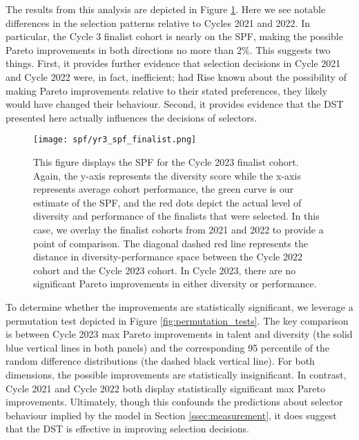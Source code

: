 
The results from this analysis are depicted in Figure \ref{fig:spf_2023}. Here we see notable differences in the selection patterns relative to Cycles 2021 and 2022. In particular, the Cycle 3 finalist cohort is nearly on the SPF, making the possible Pareto improvements in both directions no more than $2\%$. This suggests two things. First, it provides further evidence that selection decisions in Cycle 2021 and Cycle 2022 were, in fact, inefficient; had Rise known about the possibility of making Pareto improvements relative to their stated preferences, they likely would have changed their behaviour. Second, it provides evidence that the DST presented here actually influences the decisions of selectors. 

\begin{figure}[!htb]
    \centering
    \caption{This figure displays the SPF for the Cycle 2023 finalist cohort. Again, the y-axis represents the diversity score while the x-axis represents average cohort performance, the green curve is our estimate of the SPF, and the red dots depict the actual level of diversity and performance of the finalists that were selected. In this case, we overlay the finalist cohorts from 2021 and 2022 to provide a point of comparison. The diagonal dashed red line represents the distance in diversity-performance space between the Cycle 2022 cohort and the Cycle 2023 cohort. In Cycle 2023, there are no significant Pareto improvements in either diversity or performance.} 
    \label{fig:spf_2023}
    \texttt{[image: spf/yr3\_spf\_finalist.png]}
\end{figure}

To determine whether the improvements are statistically significant, we leverage a permutation test depicted in Figure \ref{fig:permutation_tests}. The key comparison is between Cycle 2023 max Pareto improvements in talent and diversity (the solid blue vertical lines in both panels) and the corresponding 95 percentile of the random difference distributions (the dashed black vertical line). For both dimensions, the possible improvements are statistically insignificant. In contrast, Cycle 2021 and Cycle 2022 both display statistically significant max Pareto improvements. Ultimately, though this confounds the predictions about selector behaviour implied by the model in Section \ref{ssec:measurement}, it does suggest that the DST is effective in improving selection decisions.

